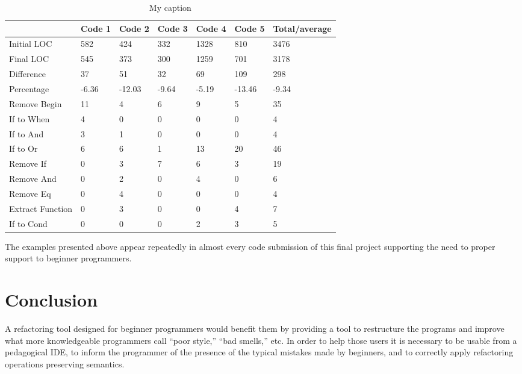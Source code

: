 \begin{table}[]
\centering
\caption{My caption}
\label{my-label}
\begin{tabular}{l|l|l|l|l|l|l}
                 & Code 1 & Code 2 & Code 3 & Code 4 & Code 5 & Total/average \\ \hline
Initial LOC      & 582    & 424    & 332    & 1328   & 810    & 3476          \\ \hline
Final LOC        & 545    & 373    & 300    & 1259   & 701    & 3178          \\ \hline
Difference       & 37     & 51     & 32     & 69     & 109    & 298           \\ \hline
Percentage       & -6.36  & -12.03 & -9.64  & -5.19  & -13.46 & -9.34         \\ \hline
Remove Begin     & 11     & 4      & 6      & 9      & 5      & 35            \\ \hline
If to When       & 4      & 0      & 0      & 0      & 0      & 4             \\ \hline
If to And        & 3      & 1      & 0      & 0      & 0      & 4             \\ \hline
If to Or         & 6      & 6      & 1      & 13     & 20     & 46            \\ \hline
Remove If        & 0      & 3      & 7      & 6      & 3      & 19            \\ \hline
Remove And       & 0      & 2      & 0      & 4      & 0      & 6             \\ \hline
Remove Eq        & 0      & 4      & 0      & 0      & 0      & 4             \\ \hline
Extract Function & 0      & 3      & 0      & 0      & 4      & 7             \\ \hline
If to Cond       & 0      & 0      & 0      & 2      & 3      & 5
\end{tabular}
\end{table}


The examples presented above appear repeatedly in almost every code submission of this final project supporting the need to
proper support to beginner programmers.



\section{Conclusion}
A refactoring tool designed for beginner programmers would benefit them
by providing a tool to restructure the programs and improve what more knowledgeable programmers call ``poor style,''
``bad smells,'' etc.
In order to help those users it is necessary to be usable from a pedagogical IDE,
to inform the programmer of the presence of the typical mistakes made by beginners, and
to correctly apply refactoring operations preserving semantics.

